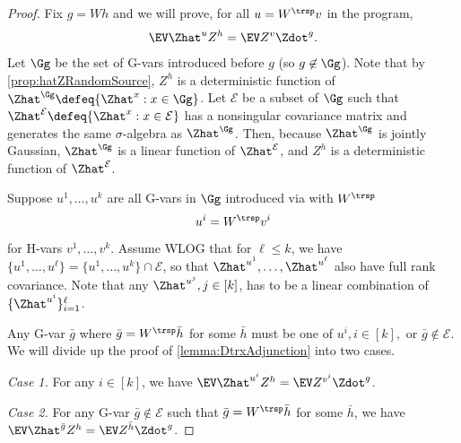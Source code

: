 \documentclass[main.tex]{subfiles}
\begin{document}
\begin{proof}
  \newcommand{\xx}{x}
  \newcommand{\Ee}{\mathcal{E}}
  \newcommand{\uu}{u}
  \newcommand{\vv}{v}
  \newcommand{\Ff}{\mathcal{F}}
  Fix $g=Wh$ and we will prove, for all $u = W^\trsp v$ in the program,
  \begin{align*}
    \EV \Zhat^{u} Z^h = \EV Z^{v} \Zdot^g.
  \end{align*}
  Let $\Gg$ be the set of G-vars introduced before $g$ (so $g\not\in\Gg$).
  Note that by \cref{prop:hatZRandomSource}, $Z^h$ is a deterministic function of $\Zhat^\Gg \defeq \{\Zhat^{x}: x \in \Gg\}$.
  Let $\Ee$ be a subset of $\Gg$ such that $\Zhat^{\Ee} \defeq \{\Zhat^{x}: x \in \Ee\}$ has a nonsingular covariance matrix and generates the same $\sigma$-algebra as $\Zhat^\Gg$.
  Then, because $\Zhat^\Gg$ is jointly Gaussian, $\Zhat^\Gg$ is a linear function of $\Zhat^\Ee$, and $Z^h$ is a deterministic function of $\Zhat^\Ee$.

  Suppose $\uu^1, \ldots, \uu^k$ are all G-vars in $\Gg$ introduced via  with $W^\trsp$
  \[\uu^i = W^\trsp \vv^i \]
  for H-vars $\vv^1, \ldots, \vv^k$.
  Assume WLOG that for $\ell \le k$, we have $\{\uu^1, \ldots, \uu^{\ell}\} = \{\uu^1, \ldots, \uu^{k}\} \cap \Ee$, so that $\Zhat^{\uu^{1}}, \ldots, \Zhat^{\uu^{{\ell}}}$ also have full rank covariance.
  Note that any $\Zhat^{\uu^{j}}, j \in [k]$, has to be a linear combination of $\{\Zhat^{\uu^i}\}_{i=1}^{\ell}$.

  Any G-var $\bar g$ where $\bar g = W^\trsp \bar h$ for some $\bar h$ must be one of $u^i, i\in[k],$ or $\bar g \not\in\Ee$.
  We will divide up the proof of \cref{lemma:DtrxAdjunction} into two cases.

  \emph{Case 1.} For any $i \in [k]$, we have $\EV \Zhat^{\uu^{i}} Z^{h} = \EV Z^{\vv^{i}} \Zdot^{g}$.

  \emph{Case 2.} For any G-var $\bar g \not \in \Ee$ such that $\bar g = W^\trsp \bar h$ for some $\bar h$, we have $\EV  \Zhat^{\bar g} Z^{h}  = \EV   Z^{\bar h} \Zdot^{g} $.


\end{proof}
\end{document}
